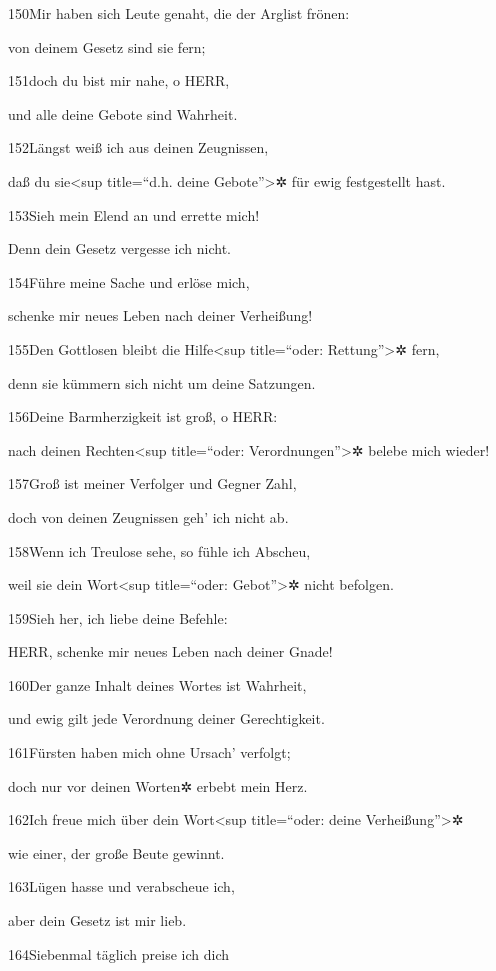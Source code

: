 150Mir haben sich Leute genaht, die der Arglist frönen:

von deinem Gesetz sind sie fern;

151doch du bist mir nahe, o HERR,

und alle deine Gebote sind Wahrheit.

152Längst weiß ich aus deinen Zeugnissen,

daß du sie\textless sup title=``d.h. deine Gebote''\textgreater✲ für
ewig festgestellt hast.

153Sieh mein Elend an und errette mich!

Denn dein Gesetz vergesse ich nicht.

154Führe meine Sache und erlöse mich,

schenke mir neues Leben nach deiner Verheißung!

155Den Gottlosen bleibt die Hilfe\textless sup title=``oder:
Rettung''\textgreater✲ fern,

denn sie kümmern sich nicht um deine Satzungen.

156Deine Barmherzigkeit ist groß, o HERR:

nach deinen Rechten\textless sup title=``oder:
Verordnungen''\textgreater✲ belebe mich wieder!

157Groß ist meiner Verfolger und Gegner Zahl,

doch von deinen Zeugnissen geh' ich nicht ab.

158Wenn ich Treulose sehe, so fühle ich Abscheu,

weil sie dein Wort\textless sup title=``oder: Gebot''\textgreater✲ nicht
befolgen.

159Sieh her, ich liebe deine Befehle:

HERR, schenke mir neues Leben nach deiner Gnade!

160Der ganze Inhalt deines Wortes ist Wahrheit,

und ewig gilt jede Verordnung deiner Gerechtigkeit.

161Fürsten haben mich ohne Ursach' verfolgt;

doch nur vor deinen Worten✲ erbebt mein Herz.

162Ich freue mich über dein Wort\textless sup title=``oder: deine
Verheißung''\textgreater✲

wie einer, der große Beute gewinnt.

163Lügen hasse und verabscheue ich,

aber dein Gesetz ist mir lieb.

164Siebenmal täglich preise ich dich

